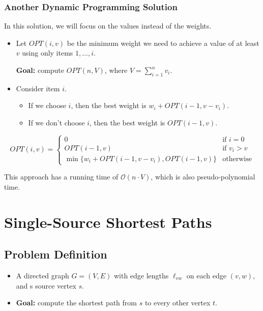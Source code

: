 \subsubsection{Another Dynamic Programming Solution}

In this solution, we will focus on the values instead of the weights.

\begin{itemize}
    \item Let $OPT(i, v)$ be the minimum weight we need to achieve a value of at least $v$ using only items $1, \dots, i$.

    \textbf{Goal:} compute $OPT(n, V)$, where $V = \sum_{i=1}^n v_i$.

    \item Consider item $i$.

    \begin{itemize}
        \item If we choose $i$, then the best weight is $w_i + OPT(i - 1, v - v_i)$.
        \item If we don't choose $i$, then the best weight is $OPT(i - 1, v)$.
    \end{itemize}
\end{itemize} \[
    OPT(i, v) = \begin{cases}
        0                                                & \text{if } i = 0   \\
        OPT(i - 1, v)                                    & \text{if } v_i > v \\
        \min\{w_i + OPT(i - 1, v - v_i), OPT(i - 1, v)\} & \text{otherwise}
    \end{cases}
\]

This approach has a running time of $\mathcal{O}(n \cdot V)$, which is also pseudo-polynomial time.


\section{Single-Source Shortest Paths}

\subsection{Problem Definition}

\begin{itemize}
    \item A directed graph $G = (V, E)$ with edge lengths $\ell_{vw}$ on each edge $(v, w)$, and s source vertex $s$.
    \item \textbf{Goal:} compute the shortest path from $s$ to every other vertex $t$.
\end{itemize}

